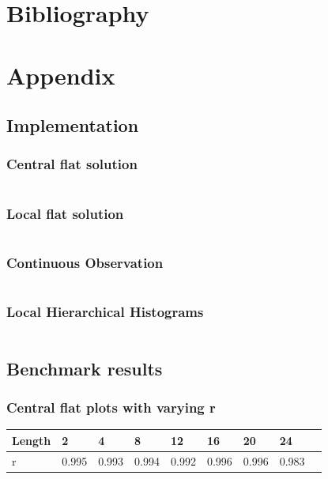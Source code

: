 \documentclass[11pt]{article}
\theoremstyle{definition}
\begin{document}
\newpage\section{Bibliography}
\printbibliography[]
\newpage\section{Appendix}
\subsection{Implementation}\label{app:imp}
\subsubsection{Central flat solution}
\inputminted[fontsize=\footnotesize,linenos]{python}{py_files/cen_flat.py}
\subsubsection{Local flat solution}
\inputminted[fontsize=\footnotesize,linenos]{python}{py_files/flat_olh.py}
\subsubsection{Continuous Observation}
\inputminted[fontsize=\footnotesize,linenos]{python}{py_files/con_obs.py}
\subsubsection{Local Hierarchical Histograms}
\inputminted[fontsize=\footnotesize,linenos]{python}{py_files/local_hh_object.py}

\subsection{Benchmark results}

\subsubsection{Central flat plots with varying r}\label{app:cen_r}
\begin{table}[H]
\begin{tabular}{|l|l|l|l|l|l|l|l|l|}
\hline
Length & 2                   & 4 & 8 & 12 & 16 & 20 & 24 \\ \hline
r      & 0.995&0.993&0.994&0.992&0.996 & 0.996 & 0.983 \\ \hline
\end{tabular}
\end{table}
\end{document}
